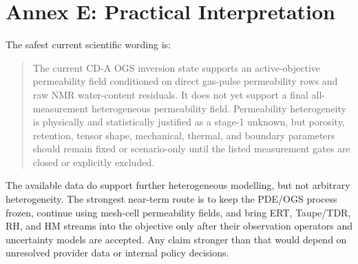 \documentclass[10pt,a4paper]{article}
\begin{document}
\section{Annex E: Practical Interpretation}

The safest current scientific wording is:

\begin{quote}
The current CD-A OGS inversion state supports an active-objective permeability field
conditioned on direct gas-pulse permeability rows and raw NMR water-content residuals.
It does not yet support a final all-measurement heterogeneous permeability field.
Permeability heterogeneity is physically and statistically justified as a stage-1
unknown, but porosity, retention, tensor shape, mechanical, thermal, and boundary
parameters should remain fixed or scenario-only until the listed measurement gates
are closed or explicitly excluded.
\end{quote}

The available data do support further heterogeneous modelling, but not arbitrary
heterogeneity.  The strongest near-term route is to keep the PDE/OGS process frozen,
continue using mesh-cell permeability fields, and bring ERT, Taupe/TDR, RH, and HM
streams into the objective only after their observation operators and uncertainty
models are accepted.  Any claim stronger than that would depend on unresolved
provider data or internal policy decisions.



\end{document}
